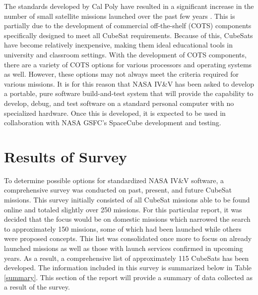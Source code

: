 \documentclass[11pt]{article}
\begin{document}
The standards developed by Cal Poly have resulted in a significant increase in the number of small satellite missions launched over the past few years \cite{MarketAssessment}.  This is partially due to the development of commercial off-the-shelf (COTS) components specifically designed to meet all CubeSat requirements.  Because of this, CubeSats have become relatively inexpensive, making them ideal educational tools in university and classroom settings.  With the development of COTS components, there are a variety of COTS options for various processors and operating systems as well.  However, these options may not always meet the criteria required for various missions.  It is for this reason that NASA IV\&V has been asked to develop a portable, pure software build-and-test system that will provide the capability to develop, debug, and test software on a standard personal computer with no specialized hardware.  Once this is developed, it is expected to be used in collaboration with NASA GSFC's SpaceCube development and testing. 

\section{Results of Survey}
To determine possible options for standardized NASA IV\&V software, a comprehensive survey was conducted on past, present, and future CubeSat missions.  This survey initially consisted of all CubeSat missions able to be found online and totaled slightly over 250 missions.  For this particular report, it was decided that the focus would be on domestic missions which narrowed the search to approximately 150 missions, some of which had been launched while others were proposed concepts.  This list was consolidated once more to focus on already launched missions as well as those with launch services confirmed in upcoming years.  As a result, a comprehensive list of approximately 115 CubeSats has been developed.  The information included in this survey is summarized below in Table \ref{summary}.  This section of the report will provide a summary of data collected as a result of the survey.  
\end{document}
